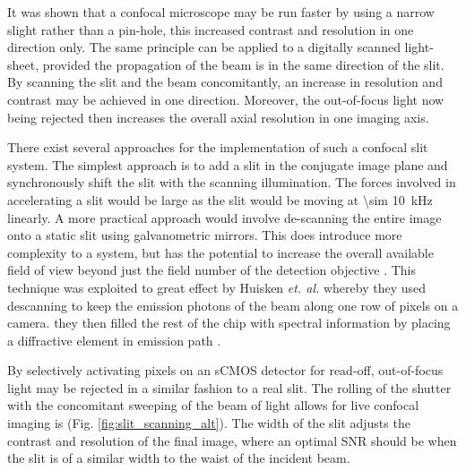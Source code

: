 It was shown that a confocal microscope may be run faster by using a narrow slight rather than a pin-hole, this increased contrast and resolution in one direction only.
The same principle can be applied to a digitally scanned light-sheet, provided the propagation of the beam is in the same direction of the slit.
By scanning the slit and the beam concomitantly, an increase in resolution and contrast may be achieved in one direction.
Moreover, the out-of-focus light now being rejected then increases the overall axial resolution in one imaging axis.

There exist several approaches for the implementation of such a confocal slit system.
The simplest approach is to add a slit in the conjugate image plane and synchronously shift the slit with the scanning illumination.
The forces involved in accelerating a slit would be large as the slit would be moving at \SI{\sim 10}{\kilo\hertz} linearly.
A more practical approach would involve de-scanning the entire image onto a static slit using galvanometric mirrors.
This does introduce more complexity to a system, but has the potential to increase the overall available field of view beyond just the field number of the detection objective \cite{Huisken}.
This technique was exploited to great effect by Huisken \emph{et. al.} whereby they used descanning to keep the emission photons of the beam along one row of pixels on a camera.
they then filled the rest of the chip with spectral information by placing a diffractive element in emission path \cite{}.

By selectively activating pixels on an sCMOS detector for read-off, out-of-focus light may be rejected in a similar fashion to a real slit.
The rolling of the shutter with the concomitant sweeping of the beam of light allows for live confocal imaging is (Fig. \ref{fig:slit_scanning_alt}).
The width of the slit adjusts the contrast and resolution of the final image, where an optimal SNR should be when the slit is of a similar width to the waist of the incident beam.

